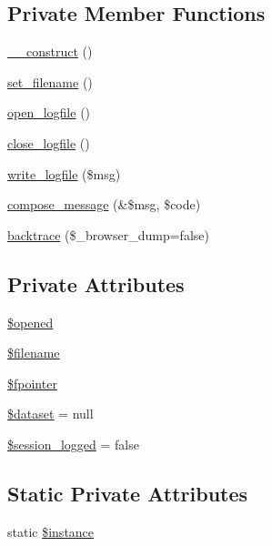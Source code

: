 \subsection*{Private Member Functions}
\begin{DoxyCompactItemize}
\item 
\hyperlink{classLogHandler_aacca49c4394109f4ccc494048a0b2cab}{\_\-\_\-construct} ()
\item 
\hyperlink{classLogHandler_a65ef4f1c6ab4cff4057f5f5932cc690e}{set\_\-filename} ()
\item 
\hyperlink{classLogHandler_aaf324e5156bf8ea83e5b4e990ea99e2d}{open\_\-logfile} ()
\item 
\hyperlink{classLogHandler_a1a3b03d9bb97404a4f746bd2aacc5a8c}{close\_\-logfile} ()
\item 
\hyperlink{classLogHandler_ae0cd68fb6f068e47f899a1e4c7f29ba9}{write\_\-logfile} (\$msg)
\item 
\hyperlink{classLogHandler_ad32511521115b21779d699c836197dd0}{compose\_\-message} (\&\$msg, \$code)
\item 
\hyperlink{classLogHandler_aaf2175a042c4c0f1e26f885c576bc304}{backtrace} (\$\_\-browser\_\-dump=false)
\end{DoxyCompactItemize}
\subsection*{Private Attributes}
\begin{DoxyCompactItemize}
\item 
\hyperlink{classLogHandler_a956e7e71a9ff96c6301d1f41a5bf207e}{\$opened}
\item 
\hyperlink{classLogHandler_ab51c12bcd654093b9d0153ab38ebad8c}{\$filename}
\item 
\hyperlink{classLogHandler_ad65c8954bda40d8a33828f0a0a2cbf5b}{\$fpointer}
\item 
\hyperlink{classLogHandler_aa133900b467a9224e64fcef83f1f9cb8}{\$dataset} = null
\item 
\hyperlink{classLogHandler_a0cfee82e814e8f258349710b6e87b72b}{\$session\_\-logged} = false
\end{DoxyCompactItemize}
\subsection*{Static Private Attributes}
\begin{DoxyCompactItemize}
\item 
static \hyperlink{classLogHandler_a1907cf33534c0b1100fa593c12bcfb6e}{\$instance}
\end{DoxyCompactItemize}


